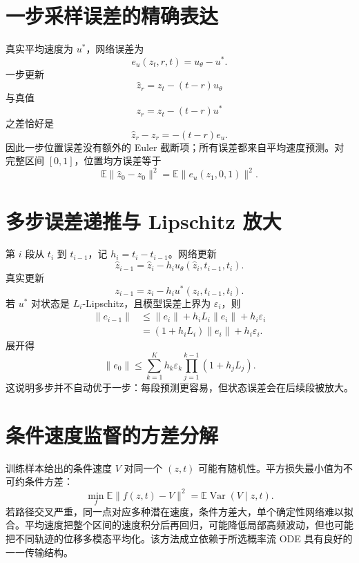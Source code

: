 \documentclass[UTF8,12pt,a4paper,fontset=none]{ctexart}
\numberwithin{equation}{section}
\newcommand{\E}{\mathbb{E}}
\begin{document}
\section{一步采样误差的精确表达}
真实平均速度为 $u^*$，网络误差为
\begin{equation}
 e_u(z_t,r,t)=u_\theta-u^*.
\end{equation}
一步更新
\begin{equation}
 \widehat z_r=z_t-(t-r)u_\theta
\end{equation}
与真值
\begin{equation}
 z_r=z_t-(t-r)u^*
\end{equation}
之差恰好是
\begin{equation}
 \boxed{\widehat z_r-z_r=-(t-r)e_u.}
\end{equation}
因此一步位置误差没有额外的 Euler 截断项；所有误差都来自平均速度预测。对完整区间 $[0,1]$，位置均方误差等于
\begin{equation}
 \E\|\widehat z_0-z_0\|^2=\E\|e_u(z_1,0,1)\|^2.
\end{equation}

\section{多步误差递推与 Lipschitz 放大}
第 $i$ 段从 $t_i$ 到 $t_{i-1}$，记 $h_i=t_i-t_{i-1}$。网络更新
\begin{equation}
 \widehat z_{i-1}=\widehat z_i-h_i u_\theta(\widehat z_i,t_{i-1},t_i).
\end{equation}
真实更新
\begin{equation}
 z_{i-1}=z_i-h_i u^*(z_i,t_{i-1},t_i).
\end{equation}
若 $u^*$ 对状态是 $L_i$-Lipschitz，且模型误差上界为 $\varepsilon_i$，则
\begin{align}
 \|e_{i-1}\|
 &\le \|e_i\|+h_iL_i\|e_i\|+h_i\varepsilon_i\\
 &=(1+h_iL_i)\|e_i\|+h_i\varepsilon_i.
\end{align}
展开得
\begin{equation}
 \|e_0\|
 \le\sum_{k=1}^{K}h_k\varepsilon_k
 \prod_{j=1}^{k-1}(1+h_jL_j).
\end{equation}
这说明多步并不自动优于一步：每段预测更容易，但状态误差会在后续段被放大。

\section{条件速度监督的方差分解}
训练样本给出的条件速度 $V$ 对同一个 $(z,t)$ 可能有随机性。平方损失最小值为不可约条件方差：
\begin{equation}
 \min_f\E\|f(z,t)-V\|^2
 =\E\operatorname{Var}(V\mid z,t).
\end{equation}
若路径交叉严重，同一点对应多种潜在速度，条件方差大，单个确定性网络难以拟合。平均速度把整个区间的速度积分后再回归，可能降低局部高频波动，但也可能把不同轨迹的位移多模态平均化。该方法成立依赖于所选概率流 ODE 具有良好的一一传输结构。
\end{document}
